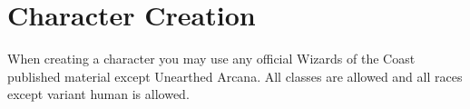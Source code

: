 \chapter{Character Creation}
When creating a character you may use any official Wizards of the Coast published material except Unearthed Arcana. All classes are allowed and all races except variant human is allowed. 